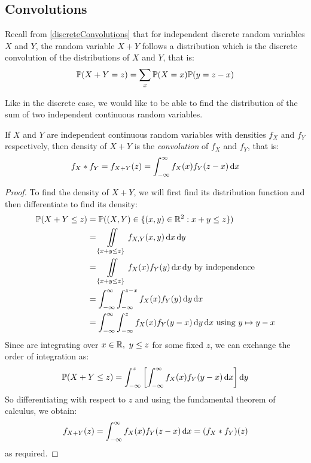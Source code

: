 \documentclass[../main.tex]{subfiles}
\begin{document}
\subsection{Convolutions}
\begin{remark}[Recap]
  Recall from \cref{discreteConvolutions} that for independent discrete random variables $X$ and $Y$, the random variable $X + Y$ follows a distribution which is the discrete convolution of the distributions of $X$ and $Y$, that is:
  \[
    \P(X + Y = z) = \sum_{x} \P(X = x)\P(y = z - x)
  \]
\end{remark}
Like in the discrete case, we would like to be able to find the distribution of the sum of two independent continuous random variables.
\begin{proposition}
  If $X$ and $Y$ are independent continuous random variables with densities $f_X$ and $f_Y$ respectively, then density of $X + Y$ is the \textit{convolution} of $f_X$ and $f_Y$, that is:
  \[
    f_X * f_Y = f_{X + Y}(z) = \int_{-\infty}^{\infty} f_X(x)f_Y(z - x) \d{x}
  \]
\end{proposition}
\begin{proof}
  To find the density of $X + Y$, we will first find its distribution function and then differentiate to find its density:
  \begin{align*}
    \P(X + Y \leq z) &= \P((X, Y) \in \{(x, y) \in \R^2: x + y \leq z\}) \\
                     &= \iint\limits_{\{x + y \leq z\}} f_{X, Y}(x, y) \d{x} \d{y} \\
                     &= \iint\limits_{\{x + y \leq z\}} f_X(x)f_Y(y) \d{x} \d{y} \text{ by independence} \\
                     &= \int_{-\infty}^{\infty} \int_{-\infty}^{z-x} f_X(x) f_Y(y) \d{y} \d{x} \\
                     &= \int_{-\infty}^{\infty}  \int_{-\infty}^{z} f_X(x) f_Y(y - x) \d{y} \d{x} \text{ using $y \mapsto y - x$}
  \end{align*}
  Since are integrating over $x \in \R,\ y \leq z$ for some fixed $z$, we can exchange the order of integration as:
  \[
    \P(X + Y \leq z) = \int_{-\infty}^{z} \left[\int_{-\infty}^{\infty} f_X(x) f_Y(y - x) \d{x}\right] \d{y}
  \]
  So differentiating with respect to $z$ and using the fundamental theorem of calculus, we obtain:
  \[
    f_{X + Y}(z) = \int_{-\infty}^{\infty} f_{X}(x)f_{Y}(z - x) \d{x} = (f_X * f_Y)(z)
  \]
  as required.
\end{proof}
\end{document}
